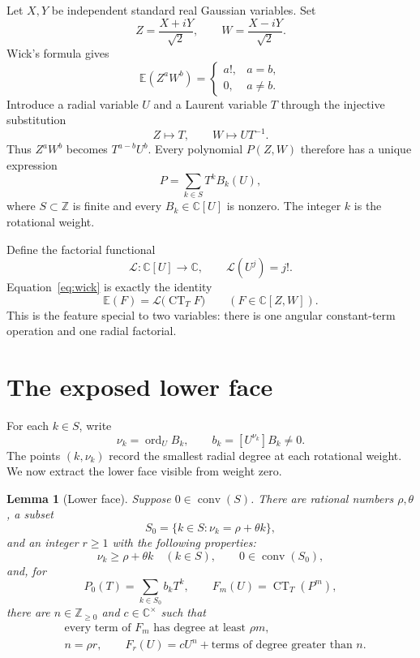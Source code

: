 \documentclass[11pt]{article}
\newtheorem{lemma}[theorem]{Lemma}
\newcommand{\C}{\mathbb C}
\newcommand{\Z}{\mathbb Z}
\newcommand{\E}{\mathbb E}
\newcommand{\CT}{\operatorname{CT}}
\newcommand{\ord}{\operatorname{ord}}
\newcommand{\conv}{\operatorname{conv}}
\begin{document}
Let \(X,Y\) be independent standard real Gaussian variables.  Set
\[
  Z=\frac{X+iY}{\sqrt2},\qquad
  W=\frac{X-iY}{\sqrt2}.
\]
Wick's formula gives
\begin{equation}\label{eq:wick}
  \E(Z^aW^b)=
  \begin{cases}
    a!,&a=b,\\
    0,&a\neq b.
  \end{cases}
\end{equation}
Introduce a radial variable \(U\) and a Laurent variable \(T\) through the
injective substitution
\[
  Z\longmapsto T,\qquad W\longmapsto UT^{-1}.
\]
Thus \(Z^aW^b\) becomes \(T^{a-b}U^b\).  Every polynomial \(P(Z,W)\)
therefore has a unique expression
\begin{equation}\label{eq:weight-decomposition}
  P=\sum_{k\in S}T^kB_k(U),
\end{equation}
where \(S\subset\Z\) is finite and every \(B_k\in\C[U]\) is nonzero.  The
integer \(k\) is the rotational weight.

Define the factorial functional
\[
  \mathcal L:\C[U]\longrightarrow\C,\qquad
  \mathcal L(U^j)=j!.
\]
Equation~\eqref{eq:wick} is exactly the identity
\begin{equation}\label{eq:expectation-factorization}
  \E(F)=\mathcal L\bigl(\CT_T F\bigr)
  \qquad(F\in\C[Z,W]).
\end{equation}
This is the feature special to two variables: there is one angular
constant-term operation and one radial factorial.

\section{The exposed lower face}

For each \(k\in S\), write
\[
  \nu_k=\ord_U B_k,\qquad
  b_k=[U^{\nu_k}]B_k\neq0.
\]
The points \((k,\nu_k)\) record the smallest radial degree at each
rotational weight.  We now extract the lower face visible from weight zero.

\begin{lemma}[Lower face]\label{lem:face}
Suppose \(0\in\conv(S)\).  There are rational numbers \(\rho,\theta\), a
subset
\[
  S_0=\{k\in S:\nu_k=\rho+\theta k\},
\]
and an integer \(r\geq1\) with the following properties:
\[
  \nu_k\geq\rho+\theta k\quad(k\in S),\qquad
  0\in\conv(S_0),
\]
and, for
\[
  P_0(T)=\sum_{k\in S_0}b_kT^k,\qquad
  F_m(U)=\CT_T(P^m),
\]
there are \(n\in\Z_{\geq0}\) and \(c\in\C^\times\) such that
\begin{align}
  &\text{every term of }F_m\text{ has degree at least }\rho m,
       \label{eq:global-bound}\\
  &n=\rho r,\qquad F_r(U)=cU^n+\text{terms of degree greater than }n.
       \label{eq:leading}
\end{align}
\end{lemma}
\end{document}
